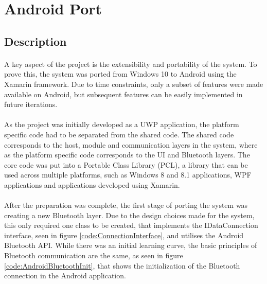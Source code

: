 \section{Android Port}
	\subsection{Description}		
		\paragraph{}{
		A key aspect of the project is the extensibility and portability of the system. To prove this, the system was ported from Windows 10 to Android using the Xamarin framework. Due to time constraints, only a subset of features were made available on Android, but subsequent features can be easily implemented in future iterations.
		}
		\paragraph{}{
		As the project was initially developed as a UWP application, the platform specific code had to be separated from the shared code. The shared code corresponds to the host, module and communication layers in the system, where as the platform specific code corresponds to the UI and Bluetooth layers. The core code was put into a Portable Class Library (PCL), a library that can be used across multiple platforms, such as Windows 8 and 8.1 applications, WPF applications and applications developed using Xamarin.
		}
		
		\paragraph{}{
		After the preparation was complete, the first stage of porting the system was creating a new Bluetooth layer. Due to the design choices made for the system, this only required one class to be created, that implements the IDataConnection interface, seen in figure \ref{code:ConnectionInterface}, and utilises the Android Bluetooth API. While there was an initial learning curve, the basic principles of Bluetooth communication are the same, as seen in figure \ref{code:AndroidBluetoothInit}, that shows the initialization of the Bluetooth connection in the Android application.
		}
		
